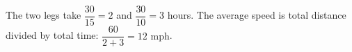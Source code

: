 The two legs take $\dfrac{30}{15}=2$ and $\dfrac{30}{10}=3$ hours. The average speed is total distance divided by total time: $\dfrac{60}{2+3}=\boxed{12\text{ mph}}$.

